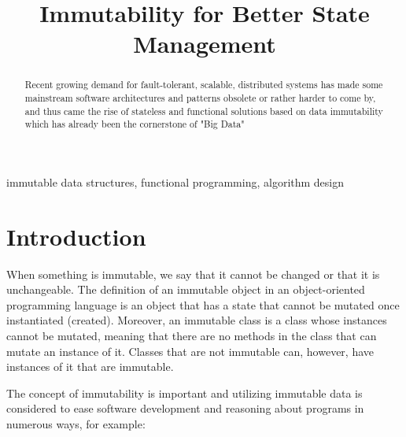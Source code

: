 \documentclass[conference]{IEEEtran}
\begin{document}
\title{Immutability for Better State Management}

\author{
\and
{}
}

\maketitle



\begin{abstract}
    Recent growing demand for fault-tolerant, scalable, distributed systems has made some mainstream software architectures and patterns obsolete or rather harder to come by, and thus came the rise of stateless and functional solutions based on data immutability which has already been the cornerstone of "Big Data"

\end{abstract}

\begin{IEEEkeywords}
immutable data structures, functional programming, algorithm design
\end{IEEEkeywords}

\section{Introduction}
When something is immutable, we say that it cannot be changed or that it is unchangeable. The definition
of an immutable object in an object-oriented programming language is an object that has a state
that cannot be mutated once instantiated (created). Moreover, an immutable class is a class whose instances
cannot be mutated, meaning that there are no methods in the class that can mutate an instance
of it. Classes that are not immutable can, however, have instances of it that are immutable. 

The concept of immutability is important and
utilizing immutable data is considered to ease software development and reasoning about programs in
numerous ways, for example:
\end{document}
